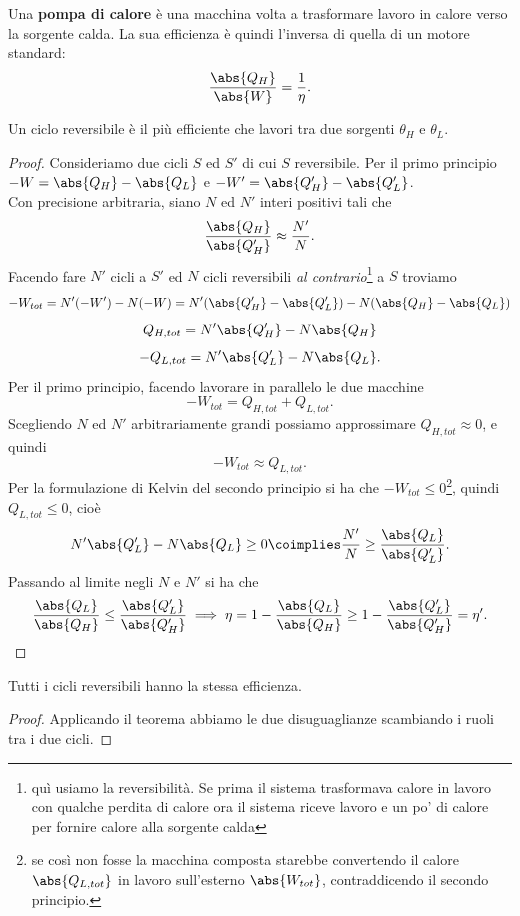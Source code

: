 \begin{definition}
Una \textbf{pompa di calore} \`e una macchina volta a trasformare lavoro in calore verso la sorgente calda. La sua efficienza \`e quindi l'inversa di quella di un motore standard:
\[\frac{\abs{Q_H}}{\abs{W}}=\frac1\eta.\]
\end{definition}

\begin{theorem}[di Carnot]\label{TeoremaDiCarnot}
Un ciclo reversibile \`e il pi\`u efficiente che lavori tra due sorgenti $\theta_H$ e $\theta_L$.
\end{theorem}
\begin{proof}
Consideriamo due cicli $S$ ed $S'$ di cui $S$ reversibile. Per il primo principio $-W=\abs{Q_H}-\abs{Q_L}$ e $-W'=\abs{Q_H'}-\abs{Q_L'}$.\\
Con precisione arbitraria, siano $N$ ed $N'$ interi positivi tali che
\[\frac{\abs{Q_H}}{\abs{Q_H'}}\approx \frac{N'}{N}.\]
Facendo fare $N'$ cicli a $S'$ ed $N$ cicli reversibili \textit{al contrario}\footnote{qu\`i usiamo la reversibilit\`a. Se prima il sistema trasformava calore in lavoro con qualche perdita di calore ora il sistema riceve lavoro e un po' di calore per fornire calore alla sorgente calda} a $S$ troviamo
\[-W_{tot}=N'(-W')-N(-W)=N'(\abs{Q_H'}-\abs{Q_L'})-N(\abs{Q_H}-\abs{Q_L})\]
\[Q_{H,tot}=N'\abs{Q_H'}-N\abs{Q_H}\]
\[-Q_{L,tot}=N'\abs{Q_L'}-N\abs{Q_L}.\]
Per il primo principio, facendo lavorare in parallelo le due macchine
\[-W_{tot}=Q_{H,tot}+Q_{L,tot}.\]
Scegliendo $N$ ed $N'$ arbitrariamente grandi possiamo approssimare $Q_{H,tot}\approx 0$, e quindi
\[-W_{tot}\approx Q_{L,tot}.\]
Per la formulazione di Kelvin del secondo principio si ha che $-W_{tot}\leq0$\footnote{se cos\`i non fosse la macchina composta starebbe convertendo il calore $\abs{Q_{L,tot}}$ in lavoro sull'esterno $\abs{W_{tot}}$, contraddicendo il secondo principio.}, quindi $Q_{L,tot}\leq 0$, cio\`e
\[N'\abs{Q_L'}-N\abs{Q_L}\geq 0\coimplies \frac{N'}N\geq \frac{\abs{Q_L}}{\abs{Q_L'}}.\]
Passando al limite negli $N$ e $N'$ si ha che
\[\frac{\abs{Q_L}}{\abs{Q_H}}\leq \frac{\abs{Q_L'}}{\abs{Q_H'}}\implies \eta=1-\frac{\abs{Q_L}}{\abs{Q_H}}\geq 1-\frac{\abs{Q_L'}}{\abs{Q_H'}}=\eta'.\]
\end{proof}

\begin{corollary}\label{CicliReversibiliHannoLaStessaEfficienza}
Tutti i cicli reversibili hanno la stessa efficienza.
\end{corollary}
\begin{proof}
Applicando il teorema abbiamo le due disuguaglianze scambiando i ruoli tra i due cicli.
\end{proof}


